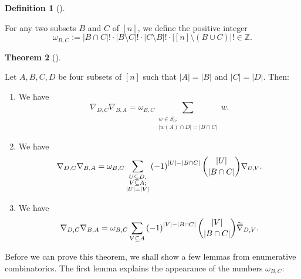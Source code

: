 \documentclass[numbers=enddot,12pt,final,onecolumn,notitlepage]{scrartcl}%
\numberwithin{exer}{subsection}
\theoremstyle{definition}
\newtheorem{theo}{Theorem}[subsection]
\newenvironment{theorem}[1][]
{\begin{theo}[#1]\begin{leftbar}}
{\end{leftbar}\end{theo}}
\newtheorem{defi}[theo]{Definition}
\newenvironment{definition}[1][]
{\begin{defi}[#1]\begin{leftbar}}
{\end{leftbar}\end{defi}}
\let\sumnonlimits\sum
\renewcommand{\sum}{\sumnonlimits\limits}
\begin{document}
\begin{definition}
\label{def.omegaBC}For any two subsets $B$ and $C$ of $\left[  n\right]  $, we
define the positive integer%
\[
\omega_{B,C}:=\left\vert B\cap C\right\vert !\cdot\left\vert B\setminus
C\right\vert !\cdot\left\vert C\setminus B\right\vert !\cdot\left\vert \left[
n\right]  \setminus\left(  B\cup C\right)  \right\vert !\in\mathbb{Z}.
\]

\end{definition}

\begin{theorem}
\label{thm.Nabla.prod0}Let $A,B,C,D$ be four subsets of $\left[  n\right]  $
such that $\left\vert A\right\vert =\left\vert B\right\vert $ and $\left\vert
C\right\vert =\left\vert D\right\vert $. Then:

\begin{enumerate}
\item[\textbf{(a)}] We have%
\[
\nabla_{D,C}\nabla_{B,A}=\omega_{B,C}\sum_{\substack{w\in S_{n};\\\left\vert
w\left(  A\right)  \cap D\right\vert =\left\vert B\cap C\right\vert }}w.
\]


\item[\textbf{(b)}] We have%
\[
\nabla_{D,C}\nabla_{B,A}=\omega_{B,C}\sum_{\substack{U\subseteq D,\\V\subseteq
A;\\\left\vert U\right\vert =\left\vert V\right\vert }}\left(  -1\right)
^{\left\vert U\right\vert -\left\vert B\cap C\right\vert }\dbinom{\left\vert
U\right\vert }{\left\vert B\cap C\right\vert }\nabla_{U,V}.
\]


\item[\textbf{(c)}] We have%
\[
\nabla_{D,C}\nabla_{B,A}=\omega_{B,C}\sum_{V\subseteq A}\left(  -1\right)
^{\left\vert V\right\vert -\left\vert B\cap C\right\vert }\dbinom{\left\vert
V\right\vert }{\left\vert B\cap C\right\vert }\widetilde{\nabla}_{D,V}.
\]

\end{enumerate}
\end{theorem}

Before we can prove this theorem, we shall show a few lemmas from enumerative
combinatorics. The first lemma explains the appearance of the numbers
$\omega_{B,C}$:
\end{document}
